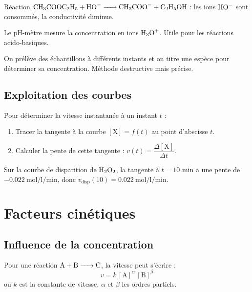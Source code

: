 \begin{exemple}
Réaction $\ce{CH3COOC2H5 + HO- -> CH3COO- + C2H5OH}$ : les ions $\ce{HO-}$ sont consommés, la conductivité diminue.
\end{exemple}

\begin{experience}
Le pH-mètre mesure la concentration en ions $\ce{H3O+}$. Utile pour les réactions acido-basiques.
\end{experience}

\begin{experience}
On prélève des échantillons à différents instants et on titre une espèce pour déterminer sa concentration. Méthode destructive mais précise.
\end{experience}

\subsection{Exploitation des courbes}

\begin{propriete}
Pour déterminer la vitesse instantanée à un instant $t$ :
\begin{enumerate}
\item Tracer la tangente à la courbe $[\mathrm{X}] = f(t)$ au point d'abscisse $t$.
\item Calculer la pente de cette tangente : $v(t) = \dfrac{\Delta[\mathrm{X}]}{\Delta t}$.
\end{enumerate}
\end{propriete}

\begin{exemple}
Sur la courbe de disparition de $\ce{H2O2}$, la tangente à $t=10$ min a une pente de $-\SI{0,022}{\mol\per\litre\per\minute}$, donc $v_{\text{disp}}(10) = \SI{0,022}{\mol\per\litre\per\minute}$.
\end{exemple}

\section{Facteurs cinétiques}

\subsection{Influence de la concentration}

\begin{loi}
Pour une réaction $\ce{A + B -> C}$, la vitesse peut s'écrire :
\[
v = k\,[\mathrm{A}]^\alpha\,[\mathrm{B}]^\beta
\]
où $k$ est la constante de vitesse, $\alpha$ et $\beta$ les ordres partiels.
\end{loi}

